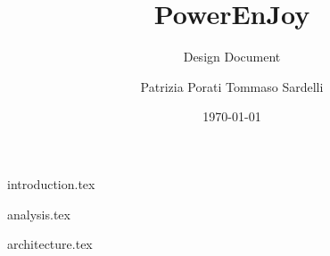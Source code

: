 \documentclass{beamer}
\author{Patrizia Porati \newline Tommaso Sardelli}
\title{PowerEnJoy}
\subtitle{Design Document}
\institute{Politecnico di Milano}
\date{\today}
\begin{document}
{introduction.tex}

{analysis.tex}

{architecture.tex}


\end{document}
